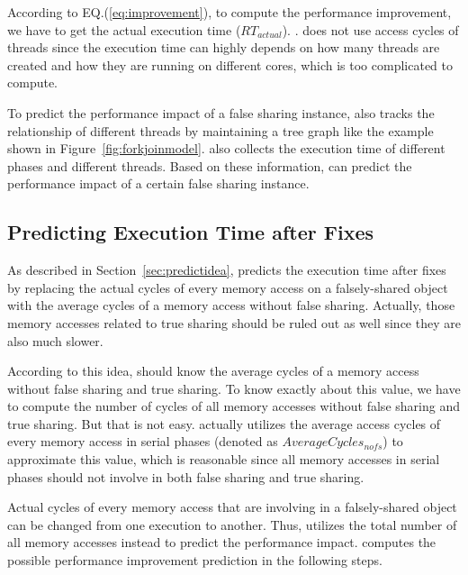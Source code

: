 According to EQ.(\ref{eq:improvement}), to compute the performance improvement, we have to get the actual execution time ($RT_{actual}$). 
.  \cheetah{} does not use access cycles of threads since the execution time can highly depends on how many threads are created and how they are running on different cores, which is too complicated to compute.  

To predict the performance impact of a false sharing instance, \Cheetah{} also tracks the relationship of different threads by maintaining a tree graph like the example shown in Figure~\ref{fig:forkjoinmodel}. \Cheetah{} also collects the execution time of different phases and different threads. Based on these information, \Cheetah{} can predict the performance impact of a certain false sharing instance. 
 
\subsection{Predicting Execution Time after Fixes}
\label{sec:predicttime}

As described in Section~\ref{sec:predictidea}, \cheetah{} predicts the execution time after fixes by replacing the actual cycles of every memory access on a falsely-shared object with the average cycles of a memory access without false sharing. Actually, those memory accesses related to true sharing should be ruled out as well since they are also much slower. 

According to this idea, \cheetah{} should know the average cycles of a memory access without false sharing and true sharing. To know exactly about this value, we have to compute the number of cycles of all memory accesses without false sharing and true sharing. But that is not easy. \Cheetah{} actually utilizes the average access cycles of every memory access in serial phases (denoted as $AverageCycles_{nofs}$) to approximate this value, which is reasonable since all memory accesses in serial phases should not involve in both false sharing and true sharing. 

Actual cycles of every memory access that are involving in a falsely-shared object can be changed from one execution to another. Thus, \cheetah{} utilizes the total number of all memory accesses instead to predict the performance impact. \Cheetah{} computes the possible performance improvement prediction in the following steps.
 

